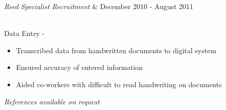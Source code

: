 \documentclass{res}
\begin{document}
{\begin{resume}
\begin{ncolumn}{2}
{\it Reed Specialist Recruitment}  &   December 2010 - August 2011
\end{ncolumn}\\
Data Entry -  \\
\begin{itemize}
\item Transcribed data from handwritten documents to digital system
\item Ensured accuracy of entered information
\item Aided co-workers with difficult to read handwriting on documents
\end{itemize}
 
\begin{center}
\it References available on request
\end{center}

\end{resume}

\vfill} %
\end{document}
